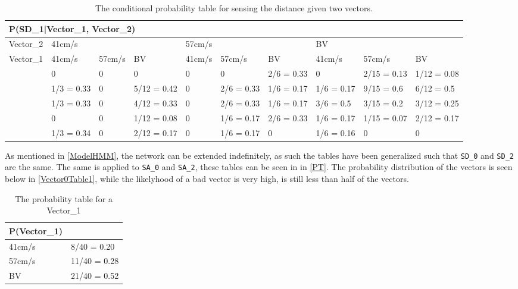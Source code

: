 \begin{table}[H]
\centering
\begin{tabular}{|l|p{1.2cm}|p{1.2cm}|p{1.2cm}|p{1.2cm}|p{1.2cm}|p{1.2cm}|p{1.2cm}|p{1.2cm}|p{1.2cm}|}
\hline
\multicolumn{10}{|l|}{P(SD\_1|Vector\_1, Vector\_2)} \\\hline
Vector\_2 & \multicolumn{3}{l|}{41cm/s} & \multicolumn{3}{l|}{57cm/s} &
\multicolumn{3}{l|}{BV}\\\hline
Vector\_1 & 41cm/s      &  57cm/s     & BV     & 41cm/s      & 57cm/s     
& BV & 41cm/s & 57cm/s & BV \\\hline
[0-60]& 0 & 0 & 0 & 0 & 0 & 2/6 = 0.33& 0 & 2/15 = 0.13 & 1/12 = 0.08 \\\hline
[60-75]& 1/3 = 0.33 & 0 & 5/12 = 0.42 & 0 & 2/6 = 0.33 & 1/6 = 0.17 & 1/6 = 0.17
& 9/15 = 0.6 & 6/12 = 0.5\\ \hline
[75-90] & 1/3 = 0.33 & 0 & 4/12 = 0.33 & 0 & 2/6 = 0.33 & 1/6 = 0.17 & 3/6 =
0.5 & 3/15 = 0.2 &3/12 = 0.25\\\hline
[90-105] & 0 & 0 & 1/12 = 0.08 & 0 & 1/6 = 0.17 & 2/6 = 0.33 & 1/6 = 0.17
& 1/15 = 0.07 & 2/12 = 0.17\\\hline
[105-255] & 1/3 = 0.34 & 0 & 2/12 = 0.17& 0 & 1/6 = 0.17 & 0 & 1/6 = 0.16 & 0
&0\\\hline
\end{tabular}
\caption{The conditional probability table for sensing the distance given two
vectors.}
\label{SDtable21}
\end{table}

As mentioned in \autoref{ModelHMM}, the network can be extended indefinitely,
as such the tables have been generalized such that \texttt{SD\_0} and
\texttt{SD\_2} are the same. The same is applied to \texttt{SA\_0} and
\texttt{SA\_2}, these tables can be seen in in \autoref{PT}. The probability
distribution of the vectors is seen below in \autoref{Vector0Table1}, while the
likelyhood of a bad vector is very high, is still less than half of the vectors.

\begin{table}[H]
\centering
\begin{tabular}{|l|l|}
\hline
P(Vector\_1) &\\ \hline
41cm/s & 8/40 = 0.20   \\ \hline 
57cm/s & 11/40 = 0.28  \\ \hline
BV & 21/40 = 0.52  \\ \hline
\end{tabular}
\caption{The probability table for a Vector\_1}
\label{Vector0Table1}
\end{table}


